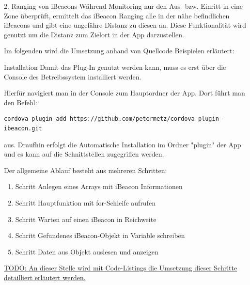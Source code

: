2. Ranging von iBeacons
Während Monitoring nur den Aus- bzw. Einritt in eine Zone überprüft, ermittelt das iBeacon Ranging alle in der nähe befindlichen iBeacons und gibt eine ungefähre Distanz zu diesen an. Diese Funktionalität wird genutzt um die Distanz zum Zielort in der App darzustellen.\cite{MonitorRange}


Im folgenden wird die Umsetzung anhand von Quellcode Beispielen erläutert:

Installation
Damit das Plug-In genutzt werden kann, muss es erst über die Console des Betreibssystem installiert werden.

Hierfür navigiert man in der Console zum Hauptordner der App. Dort führt man den Befehl:

\begin{lstlisting}
cordova plugin add https://github.com/petermetz/cordova-plugin-ibeacon.git
\end{lstlisting} 


aus. Draufhin erfolgt die Automatische Installation im Ordner "plugin" der App und es kann auf die Schnittstellen zugegriffen werden.

Der allgemeine Ablauf besteht aus mehreren Schritten:
\begin{enumerate}
\item Schritt Anlegen eines Arrays mit iBeacon Informationen
\item Schritt Hauptfunktion mit for-Schleife aufrufen
\item Schritt Warten auf einen iBeacon in Reichweite
\item Schritt Gefundenes iBeacon-Objekt in Variable schreiben
\item Schritt Daten aus Objekt auslesen und anzeigen
\end{enumerate}



\underline{TODO: An dieser Stelle wird mit Code-Listings die Umsetzung dieser Schritte }\\
\underline{detailliert erläutert werden.}

